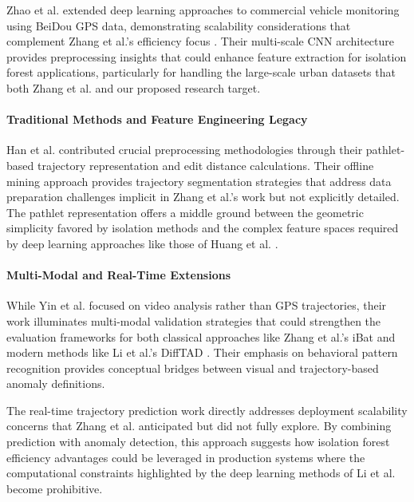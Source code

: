 \documentclass[runningheads]{llncs}
\begin{document}
Zhao et al. \cite{zhao2021research} extended deep learning approaches to commercial vehicle monitoring using BeiDou GPS data, demonstrating scalability considerations that complement Zhang et al.'s efficiency focus \cite{zhang2011ibat}. Their multi-scale CNN architecture provides preprocessing insights that could enhance feature extraction for isolation forest applications, particularly for handling the large-scale urban datasets that both Zhang et al. and our proposed research target.

\paragraph{Traditional Methods and Feature Engineering Legacy}
Han et al. \cite{han2016anomaly} contributed crucial preprocessing methodologies through their pathlet-based trajectory representation and edit distance calculations. Their offline mining approach provides trajectory segmentation strategies that address data preparation challenges implicit in Zhang et al.'s work \cite{zhang2011ibat} but not explicitly detailed. The pathlet representation offers a middle ground between the geometric simplicity favored by isolation methods and the complex feature spaces required by deep learning approaches like those of Huang et al. \cite{huang2021vehicle}.

\paragraph{Multi-Modal and Real-Time Extensions}
While Yin et al. \cite{yin2014intelligent} focused on video analysis rather than GPS trajectories, their work illuminates multi-modal validation strategies that could strengthen the evaluation frameworks for both classical approaches like Zhang et al.'s iBat \cite{zhang2011ibat} and modern methods like Li et al.'s DiffTAD \cite{LI2024111387}. Their emphasis on behavioral pattern recognition provides conceptual bridges between visual and trajectory-based anomaly definitions.

The real-time trajectory prediction work \cite{hu2024realtime} directly addresses deployment scalability concerns that Zhang et al. \cite{zhang2011ibat} anticipated but did not fully explore. By combining prediction with anomaly detection, this approach suggests how isolation forest efficiency advantages could be leveraged in production systems where the computational constraints highlighted by the deep learning methods of Li et al. \cite{LI2024111387} become prohibitive.
\end{document}
